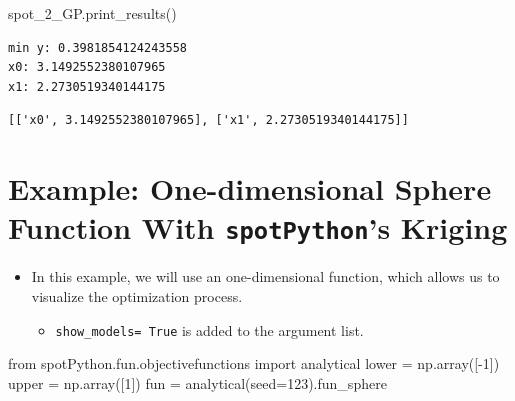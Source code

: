 \documentclass[
  letterpaper,
  DIV=11,
  numbers=noendperiod]{scrreprt}
\newenvironment{Shaded}{\begin{snugshade}}{\end{snugshade}}
\newcommand{\DecValTok}[1]{\textcolor[rgb]{0.68,0.00,0.00}{#1}}
\newcommand{\ImportTok}[1]{\textcolor[rgb]{0.00,0.46,0.62}{#1}}
\newcommand{\NormalTok}[1]{\textcolor[rgb]{0.00,0.23,0.31}{#1}}
\newcommand{\OperatorTok}[1]{\textcolor[rgb]{0.37,0.37,0.37}{#1}}
\providecommand{\tightlist}{%
  \setlength{\itemsep}{0pt}\setlength{\parskip}{0pt}}\usepackage{longtable,booktabs,array}
\begin{document}
\begin{Shaded}
\begin{Highlighting}[]
\NormalTok{spot\_2\_GP.print\_results()}
\end{Highlighting}
\end{Shaded}

\begin{verbatim}
min y: 0.3981854124243558
x0: 3.1492552380107965
x1: 2.2730519340144175
\end{verbatim}

\begin{verbatim}
[['x0', 3.1492552380107965], ['x1', 2.2730519340144175]]
\end{verbatim}

\hypertarget{example-one-dimensional-sphere-function-with-spotpythons-kriging}{%
\section{\texorpdfstring{Example: One-dimensional Sphere Function With
\texttt{spotPython}'s
Kriging}{Example: One-dimensional Sphere Function With spotPython's Kriging}}\label{example-one-dimensional-sphere-function-with-spotpythons-kriging}}

\begin{itemize}
\tightlist
\item
  In this example, we will use an one-dimensional function, which allows
  us to visualize the optimization process.

  \begin{itemize}
  \tightlist
  \item
    \texttt{show\_models=\ True} is added to the argument list.
  \end{itemize}
\end{itemize}

\begin{Shaded}
\begin{Highlighting}[]
\ImportTok{from}\NormalTok{ spotPython.fun.objectivefunctions }\ImportTok{import}\NormalTok{ analytical}
\NormalTok{lower }\OperatorTok{=}\NormalTok{ np.array([}\OperatorTok{{-}}\DecValTok{1}\NormalTok{])}
\NormalTok{upper }\OperatorTok{=}\NormalTok{ np.array([}\DecValTok{1}\NormalTok{])}
\NormalTok{fun }\OperatorTok{=}\NormalTok{ analytical(seed}\OperatorTok{=}\DecValTok{123}\NormalTok{).fun\_sphere}
\end{Highlighting}
\end{Shaded}
\end{document}
